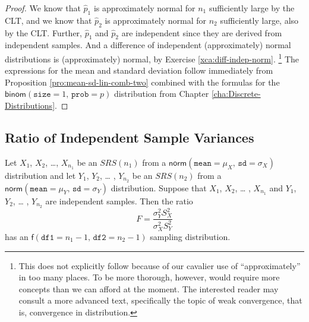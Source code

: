 \documentclass[captions=tableheading]{scrbook}
\begin{document}
\begin{proof}
We know that \(\hat{p}_{1}\) is approximately normal for \(n_{1}\) sufficiently large by the CLT, and we know that \(\hat{p}_{2}\) is approximately normal for \(n_{2}\) sufficiently large, also by the CLT. Further, \(\hat{p}_{1}\) and \(\hat{p}_{2}\) are independent since they are derived from independent samples. And a difference of independent (approximately) normal distributions is (approximately) normal, by Exercise \ref{xca:diff-indep-norm}.
\footnote{This does not explicitly follow because of our cavalier use of ``approximately'' in too many places. To be more thorough, however, would require more concepts than we can afford at the moment. The interested reader may consult a more advanced text, specifically the topic of weak convergence, that is, convergence in distribution.}
The expressions for the mean and standard deviation follow immediately from Proposition \ref{pro:mean-sd-lin-comb-two} combined with the formulas for the \(\mathsf{binom}(\mathtt{size}=1,\,\mathtt{prob}=p)\) distribution from Chapter \ref{cha:Discrete-Distributions}.
\end{proof}
\subsection{Ratio of Independent Sample Variances}
\label{sec-8-4-3}

\begin{prop}
Let \(X_{1}\), \(X_{2}\), \ldots{}, \(X_{n_{1}}\) be an \(SRS(n_{1})\) from a \(\mathsf{norm}(\mathtt{mean}=\mu_{X},\,\mathtt{sd}=\sigma_{X})\) distribution and let \(Y_{1}\), \(Y_{2}\), \ldots{} , \(Y_{n_{2}}\) be an \(SRS(n_{2})\) from a \(\mathsf{norm}(\mathtt{mean}=\mu_{Y},\,\mathtt{sd}=\sigma_{Y})\) distribution. Suppose that \(X_{1}\), \(X_{2}\), \ldots{} , \(X_{n_{1}}\) and \(Y_{1}\), \(Y_{2}\), \ldots{} , \(Y_{n_{2}}\) are independent samples. Then the ratio
\begin{equation}
F=\frac{\sigma_{Y}^{2}S_{X}^{2}}{\sigma_{X}^{2}S_{Y}^{2}}
\end{equation}
has an \(\mathsf{f}(\mathtt{df1}=n_{1}-1,\,\mathtt{df2}=n_{2}-1)\) sampling distribution.
\end{prop}
\end{document}
